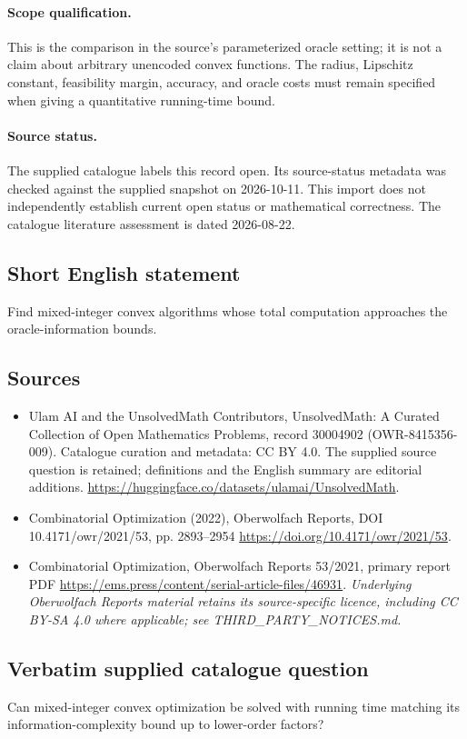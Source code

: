 \documentclass[11pt]{article}
\begin{document}
\paragraph{Scope qualification.}
This is the comparison in the source's parameterized oracle setting; it is not a claim about arbitrary unencoded convex functions. The radius, Lipschitz constant, feasibility margin, accuracy, and oracle costs must remain specified when giving a quantitative running-time bound.
\paragraph{Source status.}
The supplied catalogue labels this record open. Its source-status metadata was checked against the supplied snapshot on 2026-10-11. This import does not independently establish current open status or mathematical correctness. The catalogue literature assessment is dated 2026-08-22.
\subsection{Short English statement}
Find mixed-integer convex algorithms whose total computation approaches the oracle-information bounds.
\subsection{Sources}
\begin{itemize}
\item[S1] Ulam AI and the UnsolvedMath Contributors, UnsolvedMath: A Curated Collection of Open Mathematics Problems, record 30004902 (OWR-8415356-009). Catalogue curation and metadata: CC BY 4.0. The supplied source question is retained; definitions and the English summary are editorial additions.
\url{https://huggingface.co/datasets/ulamai/UnsolvedMath}.
\item[S2] Combinatorial Optimization (2022), Oberwolfach Reports, DOI 10.4171/owr/2021/53, pp. 2893--2954
\url{https://doi.org/10.4171/owr/2021/53}.
\item[S3] Combinatorial Optimization, Oberwolfach Reports 53/2021, primary report PDF
\url{https://ems.press/content/serial-article-files/46931}.
\textit{Underlying Oberwolfach Reports material retains its source-specific licence, including CC BY-SA 4.0 where applicable; see THIRD\_PARTY\_NOTICES.md.}
\end{itemize}
\subsection{Verbatim supplied catalogue question}
Can mixed-integer convex optimization be solved with running time matching its information-complexity bound up to lower-order factors?
\end{document}
